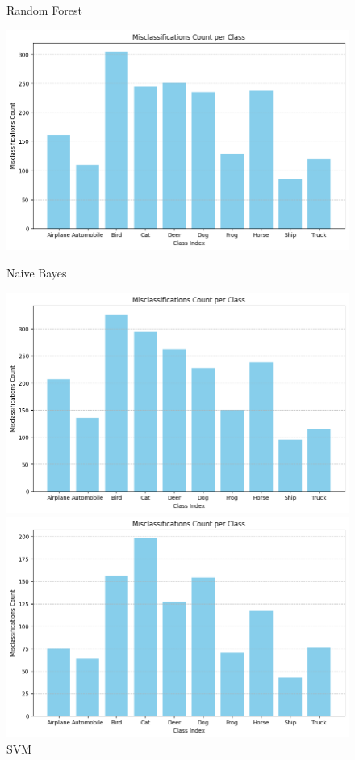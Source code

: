 \documentclass[a4paper]{article}
\theoremstyle{plain}
\theoremstyle{definition}
\begin{document}
\begin{enumerate}
\begin{figure}[h]
    \begin{minipage}{0.45\textwidth}
        \centering
        \caption{Random Forest}
        \includegraphics[width=\linewidth]{Random.png}
    \end{minipage}\hfill
    \begin{minipage}{0.45\textwidth}
        \centering
        \caption{Naive Bayes}
        \includegraphics[width=\linewidth]{Naive Bayes.png}
    \end{minipage}
    \begin{minipage}{0.45\textwidth}
        \centering
        \caption{SVM}
        \includegraphics[width=\linewidth]{SVM.png}

\end{minipage}
\end{figure}
\end{enumerate}
\end{document}
